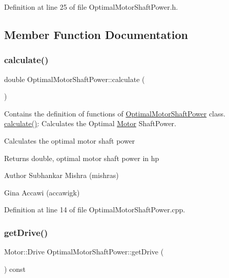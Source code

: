 Definition at line 25 of file Optimal\+Motor\+Shaft\+Power.\+h.



\subsection{Member Function Documentation}
\mbox{\label{class_optimal_motor_shaft_power_a34d47733928ae518fa6f3d08b7d8a12e}} 
\subsubsection{\texorpdfstring{calculate()}{calculate()}}
{\footnotesize\ttfamily double Optimal\+Motor\+Shaft\+Power\+::calculate (\begin{DoxyParamCaption}{ }\end{DoxyParamCaption})}



Contains the definition of functions of \hyperlink{class_optimal_motor_shaft_power}{Optimal\+Motor\+Shaft\+Power} class. \hyperlink{class_optimal_motor_shaft_power_a34d47733928ae518fa6f3d08b7d8a12e}{calculate()}\+: Calculates the Optimal \hyperlink{struct_motor}{Motor} Shaft\+Power. 

Calculates the optimal motor shaft power \begin{DoxyReturn}{Returns}
double, optimal motor shaft power in hp
\end{DoxyReturn}
\begin{DoxyAuthor}{Author}
Subhankar Mishra (mishras) 

Gina Accawi (accawigk) 
\end{DoxyAuthor}


Definition at line 14 of file Optimal\+Motor\+Shaft\+Power.\+cpp.

\mbox{\label{class_optimal_motor_shaft_power_a3cc369285d8b3582fcd8c44e5a1c37c8}} 
\subsubsection{\texorpdfstring{get\+Drive()}{getDrive()}}
{\footnotesize\ttfamily Motor\+::\+Drive Optimal\+Motor\+Shaft\+Power\+::get\+Drive (\begin{DoxyParamCaption}{ }\end{DoxyParamCaption}) const\hspace{0.3cm}{\ttfamily [inline]}}

